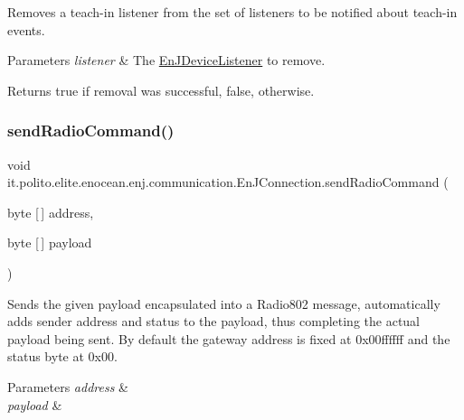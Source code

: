 Removes a teach-\/in listener from the set of listeners to be notified about teach-\/in events.


\begin{DoxyParams}{Parameters}
{\em listener} & The \hyperlink{interfaceit_1_1polito_1_1elite_1_1enocean_1_1enj_1_1communication_1_1_en_j_device_listener}{En\+J\+Device\+Listener} to remove. \\
\hline
\end{DoxyParams}
\begin{DoxyReturn}{Returns}
true if removal was successful, false, otherwise. 
\end{DoxyReturn}
\hypertarget{classit_1_1polito_1_1elite_1_1enocean_1_1enj_1_1communication_1_1_en_j_connection_a60a333560c00fb3d77744ccb356481f9}{}\label{classit_1_1polito_1_1elite_1_1enocean_1_1enj_1_1communication_1_1_en_j_connection_a60a333560c00fb3d77744ccb356481f9} 
\subsubsection{\texorpdfstring{send\+Radio\+Command()}{sendRadioCommand()}}
{\footnotesize\ttfamily void it.\+polito.\+elite.\+enocean.\+enj.\+communication.\+En\+J\+Connection.\+send\+Radio\+Command (\begin{DoxyParamCaption}\item[{byte \mbox{[}$\,$\mbox{]}}]{address,  }\item[{byte \mbox{[}$\,$\mbox{]}}]{payload }\end{DoxyParamCaption})}

Sends the given payload encapsulated into a Radio802 message, automatically adds sender address and status to the payload, thus completing the actual payload being sent. By default the gateway address is fixed at 0x00ffffff and the status byte at 0x00.


\begin{DoxyParams}{Parameters}
{\em address} & \\
\hline
{\em payload} & \\
\hline
\end{DoxyParams}
\hypertarget{classit_1_1polito_1_1elite_1_1enocean_1_1enj_1_1communication_1_1_en_j_connection_ac654fdac8366447066255d0b6e397941}{}\label{classit_1_1polito_1_1elite_1_1enocean_1_1enj_1_1communication_1_1_en_j_connection_ac654fdac8366447066255d0b6e397941} 
